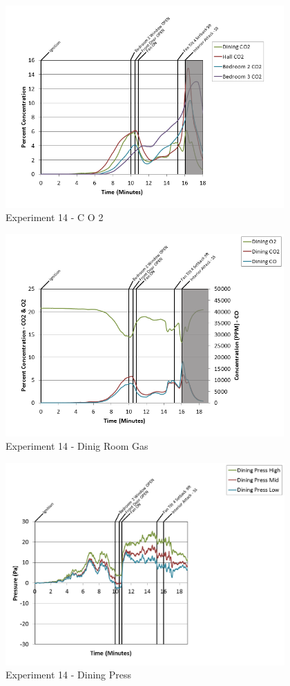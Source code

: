 \documentclass{article}
\begin{document}
\begin{appendices}
\clearpage

\begin{figure}[h!]
	\centering
	\includegraphics[height=3.05in]{0_Images/Results_Charts/Exp_14_Charts/CO2.png}
	\caption{Experiment 14 - C O 2}
\end{figure}


\begin{figure}[h!]
	\centering
	\includegraphics[height=3.05in]{0_Images/Results_Charts/Exp_14_Charts/DinigRoomGas.png}
	\caption{Experiment 14 - Dinig Room Gas}
\end{figure}

\clearpage

\begin{figure}[h!]
	\centering
	\includegraphics[height=3.05in]{0_Images/Results_Charts/Exp_14_Charts/DiningPress.png}
	\caption{Experiment 14 - Dining Press}
\end{figure}



\end{appendices}
\end{document}
